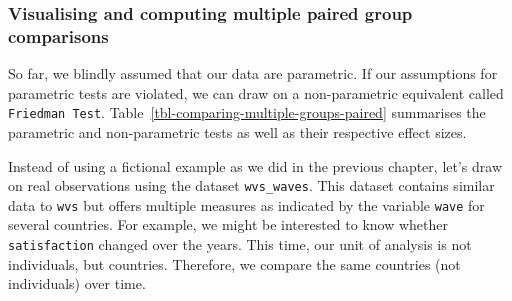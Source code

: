 \documentclass[
  letterpaper,
  DIV=11,
  numbers=noendperiod]{scrreprt}
\begin{document}
\subsubsection{Visualising and computing multiple paired group
comparisons}\label{sec-visualising-computing-multiple-paired-group-comparisons}

So far, we blindly assumed that our data are parametric. If our
assumptions for parametric tests are violated, we can draw on a
non-parametric equivalent called \texttt{Friedman\ Test}.
Table~\ref{tbl-comparing-multiple-groups-paired} summarises the
parametric and non-parametric tests as well as their respective effect
sizes.

\begin{table}

\caption{\label{tbl-comparing-multiple-groups-paired}Comparing multiple
paired groups (effect size functions from package \texttt{effectsize}}


\end{table}%

Instead of using a fictional example as we did in the previous chapter,
let's draw on real observations using the dataset \texttt{wvs\_waves}.
This dataset contains similar data to \texttt{wvs} but offers multiple
measures as indicated by the variable \texttt{wave} for several
countries. For example, we might be interested to know whether
\texttt{satisfaction} changed over the years. This time, our unit of
analysis is not individuals, but countries. Therefore, we compare the
same countries (not individuals) over time.
\end{document}
